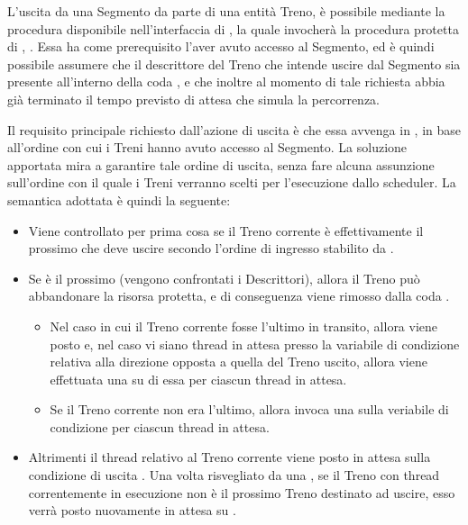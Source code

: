 \begin{description}
			\item {}
			
			L'uscita da una Segmento da parte di una entità Treno, è possibile mediante la procedura  disponibile nell'interfaccia di , la quale invocherà la procedura protetta di , . Essa ha come prerequisito l'aver avuto accesso al Segmento, ed è quindi possibile assumere che il descrittore del Treno che intende uscire dal Segmento sia presente all'interno della coda , e che inoltre al momento di tale richiesta abbia già terminato il tempo previsto di attesa che simula la percorrenza.
			
			Il requisito principale richiesto dall'azione di uscita è che essa avvenga in , in base all'ordine con cui i Treni hanno avuto accesso al Segmento. La soluzione apportata mira a garantire tale ordine di uscita, senza fare alcuna assunzione sull'ordine con il quale i Treni verranno scelti per l'esecuzione dallo scheduler. La semantica adottata è quindi la seguente:
			\begin{itemize}
				 \item Viene controllato per prima cosa se il Treno corrente è effettivamente il prossimo che deve uscire secondo l'ordine di ingresso stabilito da .
				 \item Se è il prossimo (vengono confrontati i Descrittori), allora il Treno può abbandonare la risorsa protetta, e di conseguenza viene rimosso dalla coda . 
				 \begin{itemize}
				 	\item Nel caso in cui il Treno corrente fosse l'ultimo in transito, allora viene posto  e, nel caso vi siano thread in attesa presso la variabile di condizione relativa alla direzione opposta a quella del Treno uscito, allora viene effettuata una  su di essa per ciascun thread in attesa. 
				 	\item Se il Treno corrente non era l'ultimo, allora invoca una  sulla veriabile di condizione  per ciascun thread in attesa.
				 \end{itemize}
				 \item Altrimenti il thread relativo al Treno corrente viene posto in attesa sulla condizione di uscita . Una volta risvegliato da una , se il Treno con thread correntemente in esecuzione non è il prossimo Treno destinato ad uscire, esso verrà posto nuovamente in attesa su . 
			\end{itemize}
		\end {description}
	
